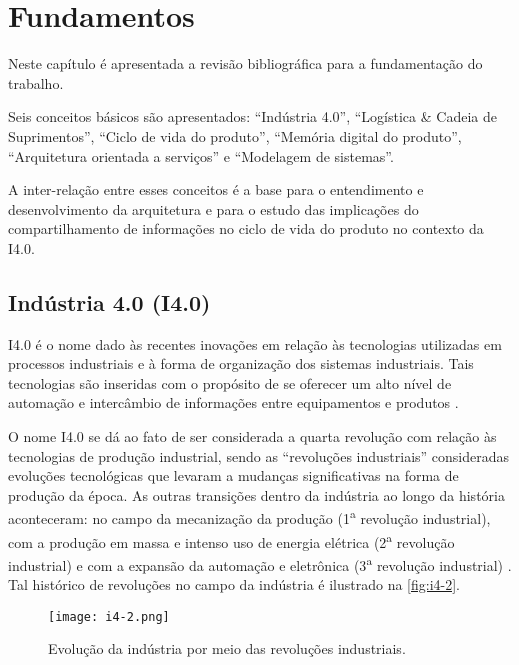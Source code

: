 \chapter{Fundamentos}
\label{cha:fundamentos}

Neste capítulo é apresentada a revisão bibliográfica para a fundamentação do trabalho.

Seis conceitos básicos são apresentados: ``Indústria 4.0'', ``Logística \& Cadeia de Suprimentos'', ``Ciclo de vida do produto'', ``Memória digital do produto'', ``Arquitetura orientada a serviços'' e ``Modelagem de sistemas''.

A inter-relação entre esses conceitos é a base para o entendimento e desenvolvimento da arquitetura e para o estudo das implicações do compartilhamento de informações no ciclo de vida do produto no contexto da I4.0.

\section{Indústria 4.0 (I4.0)}
\label{sec:industria4}

I4.0 é o nome dado às recentes inovações em relação às tecnologias utilizadas em processos industriais e à forma de organização dos sistemas industriais. Tais tecnologias são inseridas com o propósito de se oferecer um alto nível de automação e intercâmbio de informações entre equipamentos e produtos \cite{lasi2014industryfour}.

O nome I4.0 se dá ao fato de ser considerada a quarta revolução com relação às tecnologias de produção industrial, sendo as ``revoluções industriais'' consideradas evoluções tecnológicas que levaram a mudanças significativas na forma de produção da época. As outras transições dentro da indústria ao longo da história aconteceram: no campo da mecanização da produção (1\textsuperscript{a} revolução industrial), com a produção em massa e intenso uso de energia elétrica (2\textsuperscript{a} revolução industrial) e com a expansão da automação e eletrônica (3\textsuperscript{a} revolução industrial) \cite{lasi2014industryfour}. Tal histórico de revoluções no campo da indústria é ilustrado na \autoref{fig:i4-2}.

\begin{figure}[htb]
	\centering
	\texttt{[image: i4-2.png]}
	\caption{Evolução da indústria por meio das revoluções industriais.}
	\label{fig:i4-2}
\end{figure}

